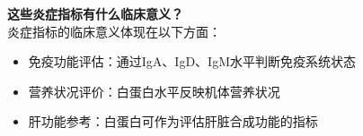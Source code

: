 \documentclass[UTF8]{ctexart}
\begin{document}
\begin{tcolorbox}[
    enhanced,
    colback=lightpurple!10, %
    colframe=white,  %
    arc=3mm,
    boxrule=0.5pt,
    width=\textwidth,
    top=8pt,
    bottom=8pt
]
{\small{\color{lightpurple}\faQuestionCircle}\quad \textbf{这些炎症指标有什么临床意义？}\\
{\color{orange!50}\faComments}\quad 炎症指标的临床意义体现在以下方面：
\begin{itemize}
    \item 免疫功能评估：通过IgA、IgD、IgM水平判断免疫系统状态
    \item 营养状况评价：白蛋白水平反映机体营养状况
    \item 肝功能参考：白蛋白可作为评估肝脏合成功能的指标
\end{itemize}
}
\end{tcolorbox}
\end{document}
